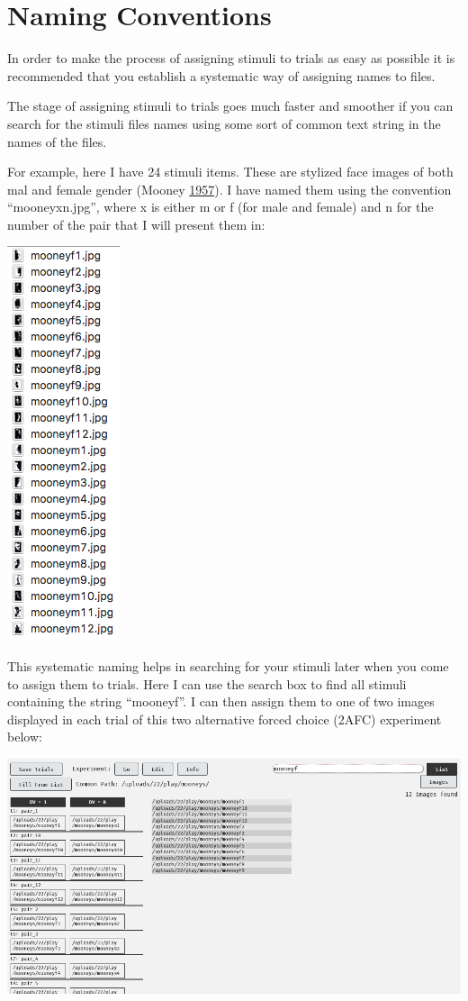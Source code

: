 \documentclass[]{book}
\begin{document}
\section{Naming Conventions}\label{naming-conventions}

In order to make the process of assigning stimuli to trials as easy as
possible it is recommended that you establish a systematic way of
assigning names to files.

The stage of assigning stimuli to trials goes much faster and smoother
if you can search for the stimuli files names using some sort of common
text string in the names of the files.

For example, here I have 24 stimuli items. These are stylized face
images of both mal and female gender (Mooney
\protect\hyperlink{ref-mooneys}{1957}). I have named them using the
convention ``mooneyxn.jpg'', where x is either m or f (for male and
female) and n for the number of the pair that I will present them in:

\includegraphics{images/screenshots/stim_1.png}

This systematic naming helps in searching for your stimuli later when
you come to assign them to trials. Here I can use the search box to find
all stimuli containing the string ``mooneyf''. I can then assign them to
one of two images displayed in each trial of this two alternative forced
choice (2AFC) experiment below:

\includegraphics{images/screenshots/stim_3.png}
\end{document}
